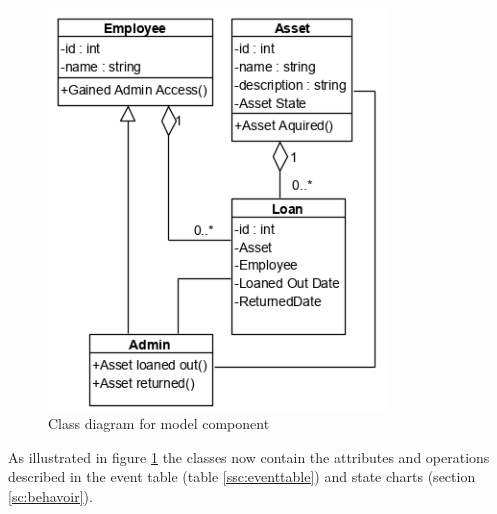 \begin{figure}[H]
    \centering
    \includegraphics[width=0.8\textwidth]{figures/Model_ComponentV3.PNG}
    \caption{Class diagram for model component}
    \label{fig:ModelComponent}
\end{figure}

As illustrated in figure \ref{fig:ModelComponent} the classes now contain the attributes and operations described in the event table (table \ref{ssc:eventtable}) and state charts (section \ref{sc:behavoir}).